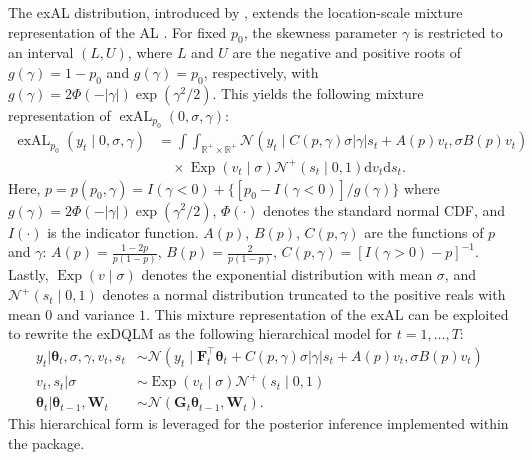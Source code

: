 \documentclass{jss}
\newcommand{\vect}[1]{\boldsymbol{#1}}
\newcommand{\mat}[1]{\mathbf{#1}}
\newcommand{\N}{\mathcal{N}}
\newcommand{\Exp}{\operatorname{Exp}}
\newcommand{\exAL}{\operatorname{exAL}}
\begin{document}
The exAL distribution, introduced by \citet{yan2025family}, extends the location-scale mixture representation of the AL \citep{kozumi2011gibbs}. For fixed $p_0$, the skewness parameter $\gamma$ is restricted to an interval $(L,U)$, where $L$ and $U$ are the negative and positive roots of $g(\gamma) = 1-p_0$ and $g(\gamma) = p_0$, respectively, with $g(\gamma) = 2\Phi(-|\gamma|)\exp(\gamma^2/2)$. This yields the following mixture representation of $\exAL_{p_0}(0,\sigma,\gamma)$:
\begin{equation}
\label{EQ:exALmix}
\begin{aligned}
\exAL_{p_0}(y_t \mid 0,\sigma,\gamma)
&=
\int\int_{\mathbb{R}^+ \times \mathbb{R}^+}
\N(y_t \mid C(p,\gamma) \sigma |\gamma| s_t + A(p) v_t, \sigma B(p) v_t)\\
&\quad \times \Exp(v_t \mid \sigma) \N^+(s_t \mid 0,1) \mathrm{d}v_t \mathrm{d}s_t.
\end{aligned}
\end{equation}
Here, $p = p(p_0,\gamma) = I(\gamma <0) + \{[p_0 - I(\gamma <0)]/g(\gamma) \}$ where $g(\gamma) = 2\Phi(-|\gamma|)\exp(\gamma^2/2)$, $\Phi(\cdot)$ denotes the standard normal CDF, and $I(\cdot)$ is the indicator function. $A(p)$, $B(p)$, $C(p,\gamma)$ are the functions of $p$ and $\gamma$: $A(p) = \frac{1-2p}{p(1-p)}$, $B(p) = \frac{2}{p(1-p)}$, $C(p,\gamma) = [I(\gamma>0) -p]^{-1}$. Lastly, $\Exp(v \mid \sigma)$ denotes the exponential distribution with mean $\sigma$, and $\N^+(s_t \mid 0,1)$ denotes a normal distribution truncated to the positive reals with mean $0$ and variance $1$. This mixture representation of the exAL can be exploited to rewrite the exDQLM as the following hierarchical model for $t=1,\dots,T$:
\begin{align}
\label{EQ:exDQLMobs}
y_t | \vect{\theta}_t,\sigma,\gamma,v_t,s_t  & \sim \N(y_t \mid \mat{F}_t^\top \vect{\theta}_t + C(p,\gamma) \sigma |\gamma| s_t + A(p) v_t,\sigma B(p) v_t) \\
v_t, s_t | \sigma & \sim \Exp(v_t \mid \sigma) \N^+(s_t \mid 0,1) \\
\label{EQ:exDQLMevo}
\vect{\theta}_t | \vect{\theta}_{t-1},\mat{W}_t & \sim  \N(\mat{G}_t \vect{\theta}_{t-1},\mat{W}_t).
\end{align}
This hierarchical form is leveraged for the posterior inference implemented within the  package.

\end{document}
